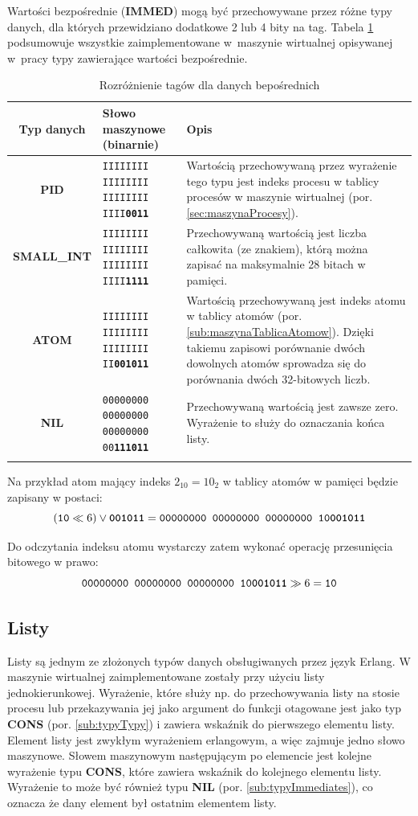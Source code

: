 Wartości bezpośrednie (\textbf{IMMED}) mogą być przechowywane przez różne typy danych, dla których przewidziano dodatkowe 2 lub 4 bity na tag. Tabela \ref{table:secondaryImmed} podsumowuje wszystkie zaimplementowane w~maszynie wirtualnej opisywanej w~pracy typy zawierające wartości bezpośrednie.

\begin{longtable}{|c|p{4cm}|p{8cm}|}
\hline

Typ danych & Słowo maszynowe (binarnie) & Opis \\
\endfirsthead
\hline

\textbf{PID} & \texttt{IIIIIIII IIIIIIII IIIIIIII IIII\textbf{0011}} & Wartością przechowywaną przez wyrażenie tego typu jest indeks procesu w tablicy procesów w maszynie wirtualnej (por. \ref{sec:maszynaProcesy}).\\
\hline
\textbf{SMALL\_INT} & \texttt{IIIIIIII IIIIIIII IIIIIIII IIII\textbf{1111}} & Przechowywaną wartością jest liczba całkowita (ze znakiem), którą można zapisać na maksymalnie 28 bitach w pamięci. \\
\hline
\textbf{ATOM} & \texttt{IIIIIIII IIIIIIII IIIIIIII II\textbf{001011}} & Wartością przechowywaną jest indeks atomu w tablicy atomów (por. \ref{sub:maszynaTablicaAtomow}). Dzięki takiemu zapisowi porównanie dwóch dowolnych atomów sprowadza się do porównania dwóch 32-bitowych liczb.  \\
\hline
\textbf{NIL} & \texttt{00000000 00000000 00000000 00\textbf{111011}} & Przechowywaną wartością jest zawsze zero. Wyrażenie to służy do oznaczania końca listy. \\
\hline
\caption{Rozróżnienie tagów dla danych bepośrednich} 
\label{table:secondaryImmed} \\
\end{longtable}

Na przykład atom mający indeks $2_{10} = 10_{2}$ w tablicy atomów w pamięci będzie zapisany w postaci:
$$(\texttt{10} \ll 6) \vee \texttt{\textbf{001011}} = \texttt{00000000 00000000 00000000 10\textbf{001011}}$$

Do odczytania indeksu atomu wystarczy zatem wykonać operację przesunięcia bitowego w prawo:
$$\texttt{00000000 00000000 00000000 10\textbf{001011}} \gg 6 = \texttt{10}$$

\subsection{Listy}
\label{sub:typyLists}

Listy są jednym ze złożonych typów danych obsługiwanych przez język Erlang.
W maszynie wirtualnej zaimplementowane zostały przy użyciu listy jednokierunkowej.
Wyrażenie, które służy np. do przechowywania listy na stosie procesu lub przekazywania jej jako argument do funkcji otagowane jest jako typ \textbf{CONS} (por. \ref{sub:typyTypy}) i zawiera wskaźnik do pierwszego elementu listy. Element listy jest zwykłym wyrażeniem erlangowym, a więc zajmuje jedno słowo maszynowe. Słowem maszynowym następującym po elemencie jest kolejne wyrażenie typu \textbf{CONS}, które zawiera wskaźnik do kolejnego elementu listy. Wyrażenie to może być również typu \textbf{NIL} (por. \ref{sub:typyImmediates}), co oznacza że dany element był ostatnim elementem listy.

